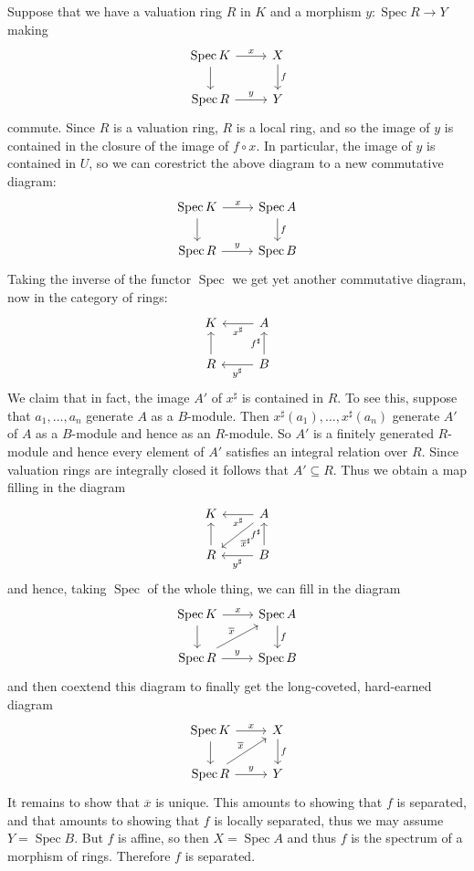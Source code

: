 \documentclass[10pt]{article}
\newcommand{\Spec}{\operatorname{Spec}}
\theoremstyle{definition}
\begin{document}
Suppose that we have a valuation ring $R$ in $K$ and a morphism $y: \Spec R \to Y$ making
$$\begin{tikzcd}
\Spec K \arrow[r,"x"] \arrow[d] & X \arrow[d,"f"] \\
\Spec R \arrow[r,"y"] & Y
\end{tikzcd}$$
commute.
Since $R$ is a valuation ring, $R$ is a local ring, and so the image of $y$ is contained in the closure of the image of $f \circ x$.
In particular, the image of $y$ is contained in $U$, so we can corestrict the above diagram to a new commutative diagram:
$$\begin{tikzcd}
\Spec K \arrow[r,"x"] \arrow[d] & \Spec A \arrow[d,"f"] \\
\Spec R \arrow[r,"y"] & \Spec B
\end{tikzcd}$$
Taking the inverse of the functor $\Spec$ we get yet another commutative diagram, now in the category of rings:
$$\begin{tikzcd}
K & A \arrow[l,"x^\sharp"] \\
R \arrow[u] & B \arrow[l, "y^\sharp"] \arrow[u,"f^\sharp"]
\end{tikzcd}$$
We claim that in fact, the image $A'$ of $x^\sharp$ is contained in $R$.
To see this, suppose that $a_1, \dots, a_n$ generate $A$ as a $B$-module.
Then $x^\sharp(a_1), \dots, x^\sharp(a_n)$ generate $A'$ of $A$ as a $B$-module and hence as an $R$-module.
So $A'$ is a finitely generated $R$-module and hence every element of $A'$ satisfies an integral relation over $R$.
Since valuation rings are integrally closed it follows that $A' \subseteq R$.
Thus we obtain a map filling in the diagram
$$\begin{tikzcd}
K & A \arrow[l,"x^\sharp"] \arrow[dl,"\overline x^\sharp"] \\
R \arrow[u] & B \arrow[l, "y^\sharp"] \arrow[u,"f^\sharp"]
\end{tikzcd}$$
and hence, taking $\Spec$ of the whole thing, we can fill in the diagram
$$\begin{tikzcd}
\Spec K \arrow[r,"x"] \arrow[d] & \Spec A \arrow[d,"f"] \\
\Spec R \arrow[r,"y"] \arrow[ur,"\overline x"] & \Spec B
\end{tikzcd}$$
and then coextend this diagram to finally get the long-coveted, hard-earned diagram
$$\begin{tikzcd}
\Spec K \arrow[r,"x"] \arrow[d] & X \arrow[d,"f"] \\
\Spec R \arrow[r,"y"] \arrow[ur,"\overline x"] & Y
\end{tikzcd}$$
It remains to show that $\overline x$ is unique.
This amounts to showing that $f$ is separated, and that amounts to showing that $f$ is locally separated, thus we may assume $Y = \Spec B$.
But $f$ is affine, so then $X = \Spec A$ and thus $f$ is the spectrum of a morphism of rings.
Therefore $f$ is separated.
\end{document}
